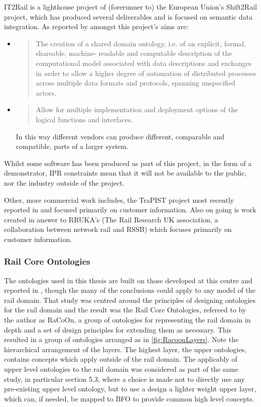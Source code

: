 IT2Rail is a lighthouse project of (\ie forerunner to) the European Union's Shift2Rail project, which has produced several deliverables and is focused on semantic data integration. As reported by \citet{Gogos2016} amongst this project's aims are:
\begin{itemize}
    \item 
    \begin{quote}
    The creation of a shared domain ontology, i.e. of an explicit, formal, shareable, machine-
readable and computable description of the computational model associated with data
descriptions and exchanges in order to allow a higher degree of automation of distributed
processes across multiple data formats and protocols, spanning unspecified actors.
    \end{quote}
    \item 
    \begin{quote}
    Allow for multiple implementation and deployment options of the logical functions and
interfaces.
    \end{quote}
 In this way different vendors can produce different, comparable and compatible, parts of a larger system.
\end{itemize}

Whilst some software has been produced as part of this project, in the form of a demonstrator, IPR constraints mean that it will not be available to the public, nor the industry outside of the project.

Other, more commercial work includes, the TraPIST project most recently reported in \citet{Bhatti2016} and focused primarily on customer information. Also on going is work created in answer to RRUKA's (The Rail Research UK association, a collaboration between network rail and RSSB)  which focuses primarily on customer information.

\subsubsection{Rail Core Ontologies}
The ontologies used in this thesis are built on those developed at this centre and reported in \citet{Tutcher2015}, though the many of the conclusions could apply to any model of the rail domain. That study was centred around the principles of designing ontologies for the rail domain and the result was the Rail Core Ontologies, refereed to by the author as RaCoOn, a group of ontologies for representing the rail domain in depth and a set of design principles for extending them as necessary. This resulted in a group of ontologies arranged as in \autoref{fig:RacoonLayers}. Note the hierarchical arrangement of the layers. The highest layer, the upper ontologies, contains concepts which apply outside of the rail domain. The applicably of upper level ontologies to the rail domain was considered as part of the same study, in particular section 5.3, where a choice is made not to directly use any pre-existing upper level ontology, but to use a design a lighter weight upper layer, which can, if needed, be mapped to BFO to provide common high level concepts.

